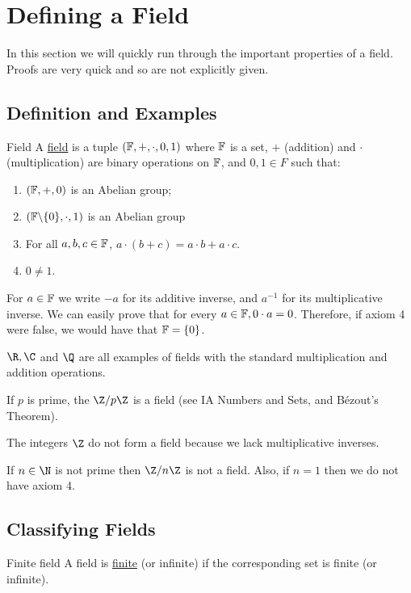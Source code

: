 \documentclass[../Main.tex]{subfiles}
\begin{document}
\section{Defining a Field}
In this section we will quickly run through the important properties of a field. Proofs are very quick and so are not explicitly given.
\subsection{Definition and Examples}
\begin{definition}{Field}
    A \underline{field} is a tuple $(\mathbb{F}, +, \cdot, 0, 1)$ where $\mathbb{F}$ is a set, $+$ (addition) and $\cdot$ (multiplication) are binary operations on $\mathbb{F}$, and $0, 1 \in F$ such that:
    \begin{enumerate}
        \item $(\mathbb{F}, +, 0)$ is an Abelian group;
        \item $(\mathbb{F} \backslash \{0\}, \cdot, 1)$ is an Abelian group
        \item For all $a, b, c \in \mathbb{F}$, $a \cdot (b + c) = a \cdot b + a \cdot c$.
        \item $0 \neq 1$.
    \end{enumerate}
\end{definition}
For $a \in \mathbb{F}$ we write $-a$ for its additive inverse, and $a^{-1}$ for its multiplicative inverse. We can easily prove that for every $a \in \mathbb{F}, 0 \cdot a = 0$. Therefore, if axiom 4 were false, we would have that $\mathbb{F} = \{0\}$.
\begin{examples}
    \item $\R, \C$ and $\Q$ are all examples of fields with the standard multiplication and addition operations.
    \item If $p$ is prime, the $\Z / p\Z$ is a field (see IA Numbers and Sets, and B\'ezout's Theorem).
\end{examples}
\begin{examples}
    \item The integers $\Z$ do not form a field because we lack multiplicative inverses.
    \item If $n \in \N$ is not prime then $\Z / n\Z$ is not a field. Also, if $n = 1$ then we do not have axiom 4.
\end{examples}
\subsection{Classifying Fields}
\begin{definition}{Finite field}
    A field is \underline{finite} (or infinite) if the corresponding set is finite (or infinite).
\end{definition}
\end{document}
